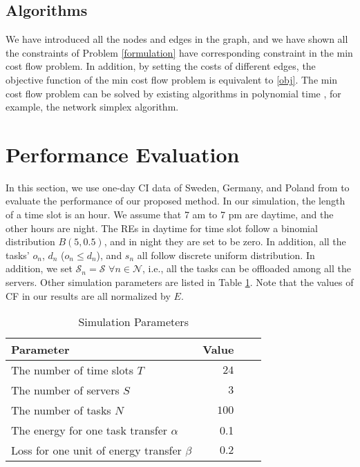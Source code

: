 \documentclass[conference, 10pt, ﬁnal, letterpaper, twocolumn]{IEEEtran}
\begin{document}
\subsection{Algorithms}

We have introduced all the nodes and edges in the graph, and we have shown all the constraints of Problem \eqref{formulation} have corresponding constraint in the min cost flow problem. In addition, by setting the costs of different edges, the objective function of the min cost flow problem is equivalent to \eqref{obj}. The min cost flow problem can be solved by existing algorithms in polynomial time \cite{10.5555/137406}, for example, the network simplex algorithm.

\section{Performance Evaluation}


In this section, we use one-day CI data of Sweden, Germany, and Poland from \cite{ElectricityMaps} to evaluate the performance of our proposed method. In our simulation, the length of a time slot is an hour. We assume that 7 am to 7 pm are daytime, and the other hours are night. The REs in daytime for time slot follow a binomial distribution $B(5, 0.5)$, and in night they are set to be zero. In addition, all the tasks' $o_{n}$, $d_n$ ($o_n \leq d_n$), and $s_n$ all follow discrete uniform distribution. In addition, we set $\mathcal{S}_n = \mathcal{S}$ $\forall n \in \mathcal{N}$, i.e., all the tasks can be offloaded among all the servers. Other simulation parameters are listed in Table \ref{tab:parameters}. Note that the values of CF in our results are all normalized by $E$. 

\begin{table}[h]
    \caption{\label{tab:parameters}Simulation Parameters}
    \begin{center}
        \begin{threeparttable}[b]
            \begin{tabular}{*{2}{lr}}
                \toprule
                \midrule
                {\bf Parameter} & {\bf Value}\\
                \midrule
                 The number of time slots $T$ & $24$ \\
                 The number of servers $S$ & $3$\\
                 The number of tasks $N$ & $100$\\
                 The energy for one task transfer $\alpha$ & 0.1\\
                 Loss for one unit of energy transfer $\beta$ & $0.2$\\
                \bottomrule
            \end{tabular}
        \end{threeparttable}
    \end{center}
\end{table}
\end{document}
